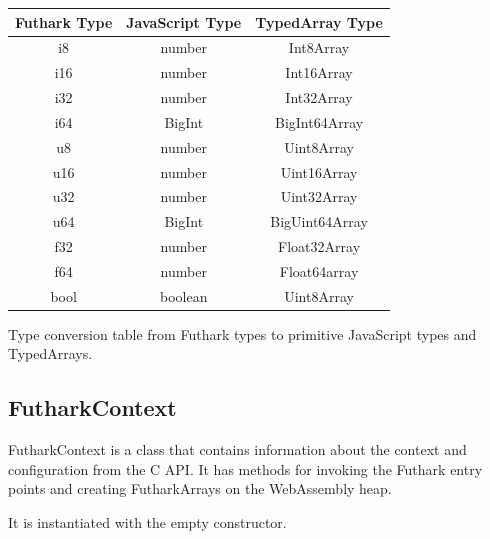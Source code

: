\documentclass[11pt]{book}
\begin{document}
\begin{listing}[H] 
\begin{table}[H]
\centering

\begin{tabular}{|c|c|c|}
\hline
\textbf{Futhark Type} & \textbf{JavaScript Type} & \textbf{TypedArray Type} \\ \hline
i8                    & number                   & Int8Array                \\ \hline
i16                   & number                   & Int16Array               \\ \hline
i32                   & number                   & Int32Array               \\ \hline
i64                   & BigInt                   & BigInt64Array            \\ \hline
u8                    & number                   & Uint8Array               \\ \hline
u16                   & number                   & Uint16Array              \\ \hline
u32                   & number                   & Uint32Array              \\ \hline
u64                   & BigInt                   & BigUint64Array           \\ \hline
f32                   & number                   & Float32Array             \\ \hline
f64                   & number                   & Float64array             \\ \hline
bool                  & boolean                  & Uint8Array               \\ \hline
\end{tabular}
\end{table}
\caption{Type conversion table from Futhark types to primitive JavaScript types and TypedArrays.}
\label{table:types}
\end{listing}


\subsection*{FutharkContext}

FutharkContext is a class that contains information about the context and configuration from the C API. It has methods for invoking the Futhark entry points and creating FutharkArrays on the WebAssembly heap. 

It is instantiated with the empty constructor.
\end{document}
